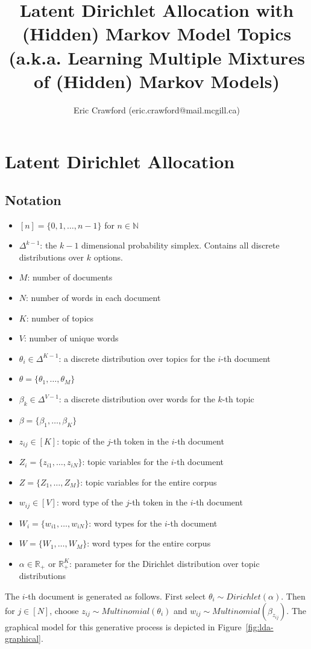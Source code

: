 \documentclass[10pt]{article}
\title{Latent Dirichlet Allocation with (Hidden) Markov Model Topics (a.k.a. Learning Multiple Mixtures of (Hidden) Markov Models)}
\author{Eric Crawford (eric.crawford@mail.mcgill.ca)}
\begin{document}
\maketitle

\section{Latent Dirichlet Allocation}

\subsection{Notation}
\begin{itemize}
        \item $[n] = \{0, 1, \dots, n-1\}$ for $n \in \mathbb{N}$
        \item $\Delta^{k-1}$: the $k-1$ dimensional probability simplex. Contains all discrete distributions over $k$ options.
        \item $M$: number of documents
        \item $N$: number of words in each document
        \item $K$: number of topics
        \item $V$: number of unique words
        \item $\theta_i \in \Delta^{K-1}$: a discrete distribution over topics for the $i$-th document
        \item $\theta = \{\theta_1, \dots, \theta_M\}$
        \item $\beta_k \in \Delta^{V-1}$: a discrete distribution over words for the $k$-th topic
        \item $\beta = \{\beta_1, \dots, \beta_K\}$
        \item $z_{ij} \in [K]$: topic of the $j$-th token in the $i$-th document
        \item $Z_i = \{z_{i1}, \dots, z_{iN}\}$: topic variables for the $i$-th document
        \item $Z = \{Z_1, \dots, Z_M\}$: topic variables for the entire corpus
        \item $w_{ij} \in [V]$: word type of the $j$-th token in the $i$-th document
        \item $W_i = \{w_{i1}, \dots, w_{iN}\}$: word types for the $i$-th document
        \item $W = \{W_{1}, \dots, W_{M}\}$: word types for the entire corpus
        \item $\alpha \in \mathbb{R_+}$ or $\mathbb{R}^K_+$: parameter for the Dirichlet distribution over topic distributions
\end{itemize}
The $i$-th document is generated as follows. First select $\theta_i \sim Dirichlet(\alpha)$. Then for $j \in [N]$, choose $z_{ij} \sim Multinomial(\theta_i)$ and $w_{ij} \sim Multinomial(\beta_{z_{ij}})$. The graphical model for this generative process is depicted in Figure~\ref{fig:lda-graphical}.
\end{document}
